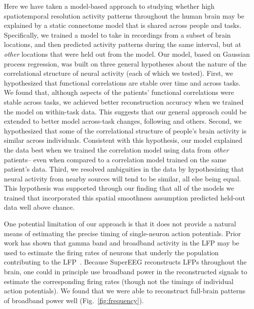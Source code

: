 \documentclass[11pt]{article}
\begin{document}
Here we have taken a model-based approach to studying whether high
spatiotemporal resolution activity patterns throughout the human brain may be
explained by a static connectome model that is shared across people and tasks.
Specifically, we trained a model to take in recordings from a subset of brain
locations, and then predicted activity patterns during the same interval, but at
\textit{other} locations that were held out from the model.  Our model, based on
Gaussian process regression, was built on three general hypotheses about the
nature of the correlational structure of neural activity (each of which we
tested).  First, we hypothesized that functional correlations are stable over
time and across tasks.  We found that, although aspects of the patients'
functional correlations were stable across tasks, we achieved better
reconstruction accuracy when we trained the model on within-task data.
This suggests that our general approach could be extended to better
model across-task changes, following \cite{ColeEtal16, TavoEtal16} and others.
Second, we hypothesized that some of the correlational structure of people's
brain activity is similar across individuals.  Consistent with this hypothesis,
our model explained the data best when we trained the correlation model using
data from \textit{other} patients-- even when compared to a correlation model
trained on the same patient's data.  Third, we resolved ambiguities in the data
by hypothesizing that neural activity from nearby sources will tend to be
similar, all else being equal.  This hypothesis was supported through our
finding that all of the models we trained that incorporated this spatial
smoothness assumption predicted held-out data well above chance.

One potential limitation of our approach is that it does not provide a natural
means of estimating the precise timing of single-neuron action potentials.
Prior work has shown that gamma band and broadband activity in the LFP may be
used to estimate the firing rates of neurons that underly the population
contributing to the LFP~\citep{MillEtal08, MannEtal09, JacoEtal10b, CronEtal11}.
Because SuperEEG reconstructs LFPs throughout the brain, one could in principle
use broadband power in the reconstructed signals to estimate the corresponding
firing rates (though not the timings of individual action potentials).  We found
that we were able to reconstruct full-brain patterns of broadband power well (Fig.~\ref{fig:frequency}).
\end{document}
